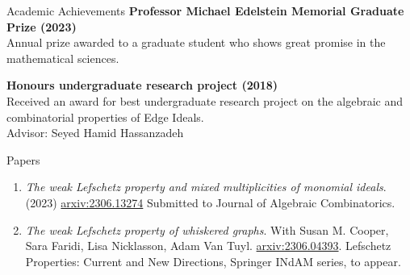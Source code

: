 \documentclass{resume} %
\begin{document}


\begin{rSection}{Academic Achievements}
{\bf Professor Michael Edelstein Memorial Graduate Prize (2023)}
\\
Annual prize awarded to a graduate student who shows great promise in the mathematical sciences. 


{\bf Honours undergraduate research project (2018)}
\\
Received an award for best undergraduate research project on the algebraic and combinatorial properties of Edge Ideals.
\\
Advisor: Seyed Hamid Hassanzadeh
\end{rSection}

\begin{rSection}{Papers}

\begin{enumerate}[label={}]
    \item \textit{The weak Lefschetz property and mixed multiplicities of monomial ideals}. (2023) \href{https://arxiv.org/abs/2306.13274}{arxiv:2306.13274} Submitted to Journal of Algebraic Combinatorics.
    \item \textit{The weak Lefschetz property of whiskered graphs}. With Susan M. Cooper, Sara Faridi, Lisa Nicklasson, Adam Van Tuyl.  \href{https://arxiv.org/abs/2306.04393}{arxiv:2306.04393}. Lefschetz Properties: Current and New Directions, Springer INdAM series, to appear. 
\end{enumerate}
\end{rSection}
\end{document}
